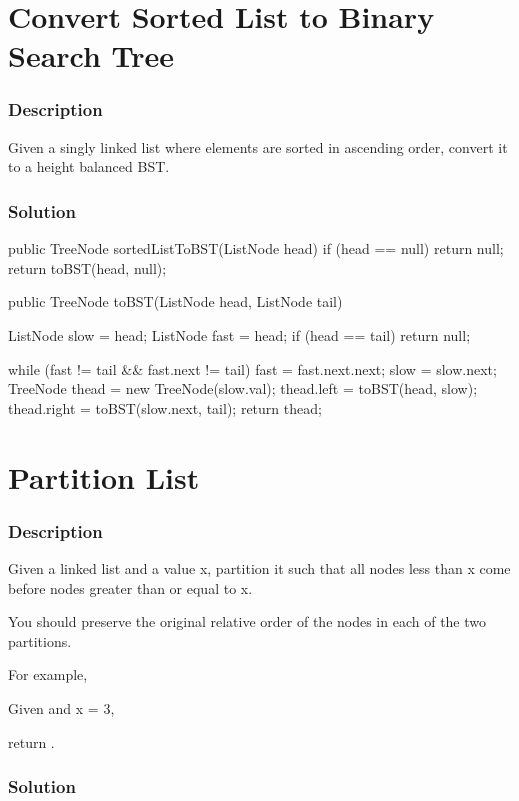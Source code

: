 \newpage

\section{Convert Sorted List to Binary Search Tree} %

\subsubsection{Description}
Given a singly linked list where elements are sorted in ascending order, convert it to a height balanced BST.
\subsubsection{Solution}

\begin{Code}
public TreeNode sortedListToBST(ListNode head) {
    if (head == null) return null;
    return toBST(head, null);
}

public TreeNode toBST(ListNode head, ListNode tail) {
    ListNode slow = head;
    ListNode fast = head;
    if (head == tail) return null;

    while (fast != tail && fast.next != tail) {
        fast = fast.next.next;
        slow = slow.next;
    }
    TreeNode thead = new TreeNode(slow.val);
    thead.left = toBST(head, slow);
    thead.right = toBST(slow.next, tail);
    return thead;
}
\end{Code}

\newpage

\section{Partition List} %

\subsubsection{Description}
Given a linked list and a value x, partition it such that all nodes less than x come before nodes greater than or equal to x.

You should preserve the original relative order of the nodes in each of the two partitions.

For example,

Given  and x = 3,

return .

\subsubsection{Solution}

